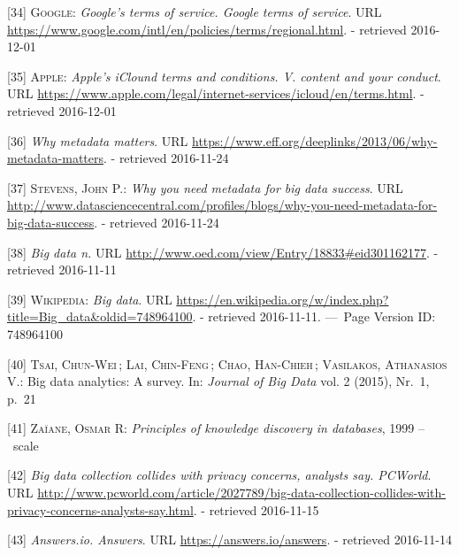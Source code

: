\documentclass[12pt,english,a4paper,titlepage,cleardoublepage=empty,dottedtoc]{report}
\begin{document}
\hypertarget{ref-web_2016_google_terms-of-service}{}
{[}34{]} \textsc{Google}: \emph{Google's terms of service. Google terms
of service}. URL
\url{https://www.google.com/intl/en/policies/terms/regional.html}. -
retrieved 2016-12-01

\hypertarget{ref-web_2016_apple-icloud_terms-of-service}{}
{[}35{]} \textsc{Apple}: \emph{Apple's iClound terms and conditions. V.
content and your conduct}. URL
\url{https://www.apple.com/legal/internet-services/icloud/en/terms.html}.
- retrieved 2016-12-01

\hypertarget{ref-web_2013_why-metadata-matters}{}
{[}36{]} \emph{Why metadata matters}. URL
\url{https://www.eff.org/deeplinks/2013/06/why-metadata-matters}. -
retrieved 2016-11-24

\hypertarget{ref-web_2016_why-you-need-metadata-for-big-data-to-success}{}
{[}37{]} \textsc{Stevens, John P.}: \emph{Why you need metadata for big
data success}. URL
\url{http://www.datasciencecentral.com/profiles/blogs/why-you-need-metadata-for-big-data-success}.
- retrieved 2016-11-24

\hypertarget{ref-web_2016_oxford_definition_big-data}{}
{[}38{]} \emph{Big data n.} URL
\url{http://www.oed.com/view/Entry/18833\#eid301162177}. - retrieved
2016-11-11

\hypertarget{ref-web_2016_wikipedia_definition_big-data}{}
{[}39{]} \textsc{Wikipedia}: \emph{Big data}. URL
\url{https://en.wikipedia.org/w/index.php?title=Big_data\&oldid=748964100}.
- retrieved 2016-11-11. ---~Page Version ID: 748964100

\hypertarget{ref-paper_2015_big-data-analytics_a-survey}{}
{[}40{]} \textsc{Tsai, Chun-Wei}\,; \textsc{Lai, Chin-Feng}\,;
\textsc{Chao, Han-Chieh}\,; \textsc{Vasilakos, Athanasios V.}: Big data
analytics: A survey. In: \emph{Journal of Big Data} vol. 2 (2015),
Nr.~1, p.~21

\hypertarget{ref-book-chapter_1999_Principles-of-knowledge-discovery-in-databases_introduction-to-data-mining}{}
{[}41{]} \textsc{Zaïane, Osmar R}: \emph{Principles of knowledge
discovery in databases}, 1999 --~scale

\hypertarget{ref-web_2013_big-data-collection-collides-with-privacy-concerns}{}
{[}42{]} \emph{Big data collection collides with privacy concerns,
analysts say. PCWorld}. URL
\url{http://www.pcworld.com/article/2027789/big-data-collection-collides-with-privacy-concerns-analysts-say.html}.
- retrieved 2016-11-15

\hypertarget{ref-web_2016_answers-io}{}
{[}43{]} \emph{Answers.io. Answers}. URL
\url{https://answers.io/answers}. - retrieved 2016-11-14
\end{document}
